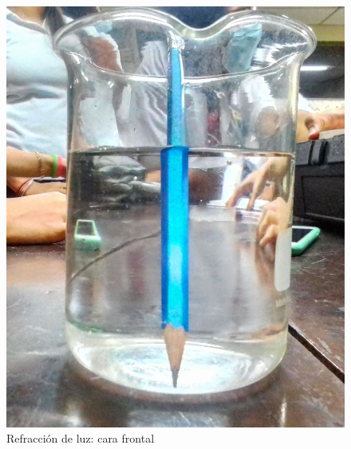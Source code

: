 \documentclass[
aps,
reprint,
amsmath, amssymb,
superscriptaddress,
]{revtex4-2}
\begin{document}
\begin{figure}
\centering
\includegraphics[width=0.5\columnwidth]{img/img0.jpg}
\caption{\label{fig:img0}Refracción de luz: cara frontal}
\end{figure}
\end{document}
